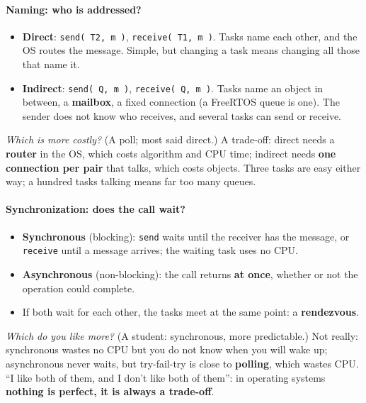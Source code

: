 \paragraph{Naming: who is addressed?}
\begin{itemize}
    \item \textbf{Direct}: \texttt{send( T2, m )}, \texttt{receive( T1, m )}. Tasks name each other, and the OS routes the message. Simple, but changing a task means changing all those that name it.
    \item \textbf{Indirect}: \texttt{send( Q, m )}, \texttt{receive( Q, m )}. Tasks name an object in between, a \textbf{mailbox}, a fixed connection (a FreeRTOS queue is one). The sender does not know who receives, and several tasks can send or receive.
\end{itemize}
\emph{Which is more costly?} (A poll; most said direct.) A trade-off: direct needs a \textbf{router} in the OS, which costs algorithm and CPU time; indirect needs \textbf{one connection per pair} that talks, which costs objects. Three tasks are easy either way; a hundred tasks talking means far too many queues.

\paragraph{Synchronization: does the call wait?}
\begin{itemize}
    \item \textbf{Synchronous} (blocking): \texttt{send} waits until the receiver has the message, or \texttt{receive} until a message arrives; the waiting task uses no CPU.
    \item \textbf{Asynchronous} (non-blocking): the call returns \textbf{at once}, whether or not the operation could complete.
    \item If both wait for each other, the tasks meet at the same point: a \textbf{rendezvous}.
\end{itemize}
\emph{Which do you like more?} (A student: synchronous, more predictable.) Not really: synchronous wastes no CPU but you do not know when you will wake up; asynchronous never waits, but try-fail-try is close to \textbf{polling}, which wastes CPU. ``I like both of them, and I don't like both of them'': in operating systems \textbf{nothing is perfect, it is always a trade-off}.

